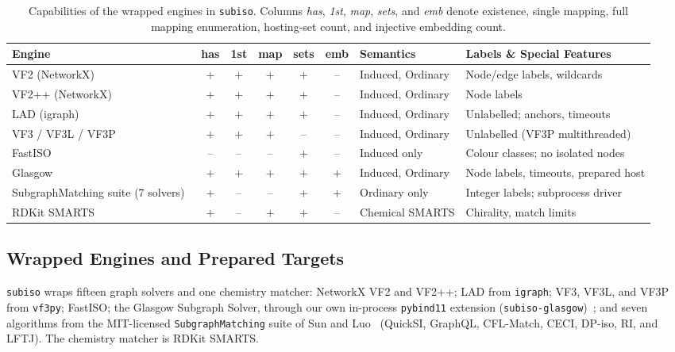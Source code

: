 \documentclass[11pt,a4paper]{article}
\begin{document}
\begin{table}[t]
\centering
\caption{Capabilities of the wrapped engines in \texttt{subiso}. Columns \emph{has}, \emph{1st}, \emph{map}, \emph{sets}, and \emph{emb} denote existence, single mapping, full mapping enumeration, hosting-set count, and injective embedding count.}
\label{tab:capabilities}
\footnotesize
\setlength{\tabcolsep}{4pt}
\begin{tabularx}{\textwidth}{@{}lccccc l Y@{}}
\toprule
\textbf{Engine} & \textbf{has} & \textbf{1st} & \textbf{map} & \textbf{sets} & \textbf{emb} & \textbf{Semantics} & \textbf{Labels \& Special Features} \\
\midrule
VF2 (NetworkX)~\cite{cordella2004vf2} & $+$ & $+$ & $+$ & $+$ & -- & Induced, Ordinary & Node/edge labels, wildcards \\
VF2++ (NetworkX)~\cite{juttner2018vf2pp} & $+$ & $+$ & $+$ & $+$ & -- & Induced, Ordinary & Node labels \\
LAD (igraph)~\cite{solnon2010lad} & $+$ & $+$ & $+$ & $+$ & -- & Induced, Ordinary & Unlabelled; anchors, timeouts \\
VF3 / VF3L / VF3P~\cite{carletti2018vf3} & $+$ & $+$ & $+$ & -- & -- & Induced, Ordinary & Unlabelled (VF3P multithreaded) \\
FastISO~\cite{agbeto2025fastiso} & -- & -- & -- & $+$ & -- & Induced only & Colour classes; no isolated nodes \\
Glasgow~\cite{mccreesh2015glasgow} & $+$ & $+$ & $+$ & $+$ & $+$ & Induced, Ordinary & Node labels, timeouts, prepared host \\
SubgraphMatching suite (7 solvers)~\cite{sun2020indepth} & $+$ & -- & -- & $+$ & $+$ & Ordinary only & Integer labels; subprocess driver \\
RDKit SMARTS & $+$ & -- & $+$ & $+$ & -- & Chemical SMARTS & Chirality, match limits \\
\bottomrule
\end{tabularx}
\end{table}

\subsection{Wrapped Engines and Prepared Targets}

\texttt{subiso} wraps fifteen graph solvers and one chemistry matcher: NetworkX VF2 and VF2++; LAD from \texttt{igraph}; VF3, VF3L, and VF3P from \texttt{vf3py}; FastISO; the Glasgow Subgraph Solver, through our own in-process \texttt{pybind11} extension (\texttt{subiso-glasgow})~\cite{glasgow_code}; and seven algorithms from the MIT-licensed \texttt{SubgraphMatching} suite of Sun and Luo~\cite{sun2020indepth,subgraphmatching_code} (QuickSI, GraphQL, CFL-Match, CECI, DP-iso, RI, and LFTJ). The chemistry matcher is RDKit SMARTS.
\end{document}
